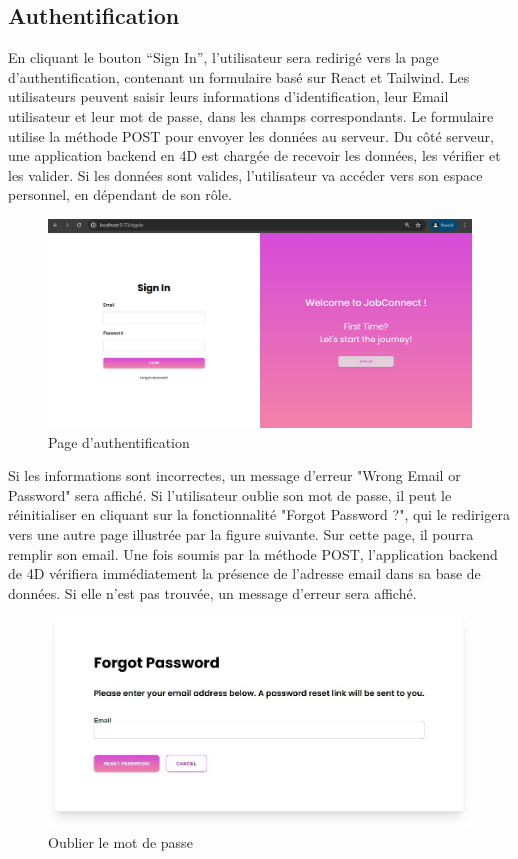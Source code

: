 \subsection{Authentification}
En cliquant le bouton “Sign In”, l’utilisateur sera redirigé vers la page d’authentification, contenant un formulaire basé sur React et Tailwind. Les utilisateurs peuvent saisir leurs  informations  d’identification, leur Email utilisateur et leur mot de passe, dans les champs correspondants. Le formulaire utilise la  méthode  POST  pour  envoyer  les données au  serveur. Du  côté serveur, une  application backend en  4D  est  chargée de recevoir les données, les vérifier  et les valider. Si les données sont valides, l’utilisateur va accéder vers son espace personnel, en dépendant de son rôle.
\newline
\begin{figure}[htbp]
   \centering
   \includegraphics[scale=0.5]{screens/signin.jpg} 
   \caption{Page d'authentification}
   \label{fig:accueil}
\end{figure}

Si les informations sont incorrectes, un message d’erreur "Wrong Email or Password" sera affiché. Si l’utilisateur oublie son mot de passe, il peut le réinitialiser en cliquant sur la fonctionnalité "Forgot Password  ?",  qui  le redirigera vers une autre page illustrée par la figure suivante. Sur cette page, il pourra remplir son  email. Une  fois soumis par  la  méthode POST, l'application backend de 4D vérifiera immédiatement la présence de l'adresse email dans sa base de données. Si elle n'est pas trouvée, un message d’erreur sera affiché.
\newline
\begin{figure}[htbp]
   \centering
   \includegraphics[scale=0.6]{screens/forgot.jpg} 
   \caption{Oublier le mot de passe}
   \label{fig:forgotPass}
\end{figure}

